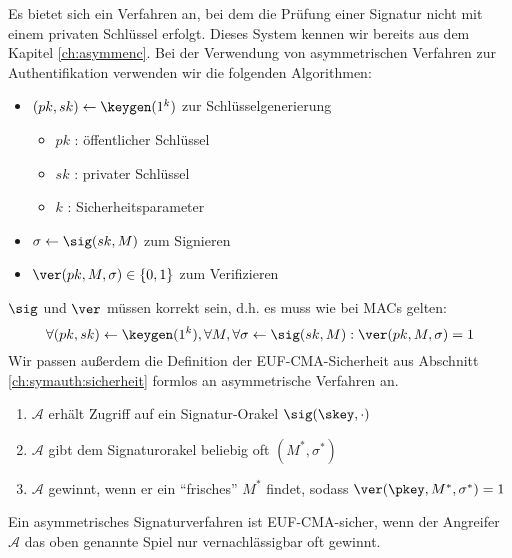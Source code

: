 Es bietet sich ein Verfahren an, bei dem die Prüfung einer Signatur nicht mit einem privaten Schlüssel erfolgt. Dieses System kennen wir bereits aus dem Kapitel \ref{ch:asymmenc}. Bei der Verwendung von asymmetrischen Verfahren zur Authentifikation verwenden wir die folgenden Algorithmen:
\begin{itemize}
  \item $(pk, sk) \leftarrow \keygen(1^k)$ zur Schlüsselgenerierung
    \begin{itemize}
      \item $pk$ : öffentlicher Schlüssel
      \item $sk$ : privater Schlüssel
      \item $k$ : Sicherheitsparameter
    \end{itemize}
  \item $\sigma \leftarrow \sig(sk,M)$ zum Signieren
  \item $\ver(pk,M,\sigma) \in \{ 0,1 \}$ zum Verifizieren
\end{itemize}
$\sig$ und $\ver$ müssen korrekt sein, d.h. es muss wie bei MACs gelten:
\begin{equation*}
    \forall (pk,sk) \leftarrow \keygen(1^k), \forall M, \forall \sigma \leftarrow \sig(sk,M) : \ver(pk,M,\sigma) = 1
\end{equation*}
Wir passen außerdem die Definition der EUF-CMA-Sicherheit aus Abschnitt \ref{ch:symauth:sicherheit} formlos an asymmetrische Verfahren an.
\begin{enumerate}
  \item $\mathcal{A}$ erhält Zugriff auf ein Signatur-Orakel $\sig(\skey,\cdot)$
  \item $\mathcal{A}$ gibt dem Signaturorakel beliebig oft $(M^*, \sigma^*)$
  \item $\mathcal{A}$ gewinnt, wenn er ein "`frisches"' $M^*$ findet, sodass $\ver(\pkey,M^*,\sigma^*) = 1$
\end{enumerate}
Ein asymmetrisches Signaturverfahren ist EUF-CMA-sicher, wenn der Angreifer $\mathcal{A}$ das oben genannte Spiel nur vernachlässigbar oft gewinnt. 

